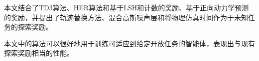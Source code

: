 \begin{conclusions}

    本文结合了TD3算法、HER算法和基于LSH和计数的奖励、基于正向动力学预测的奖励，并提出了轨迹替换方法、混合高斯噪声层和将物理仿真时间作为于未知任务的探索奖励。

    本文中的算法可以很好地用于训练可适应到给定开放任务的智能体，表现出与现有探索奖励相当的性能。
\end{conclusions}
